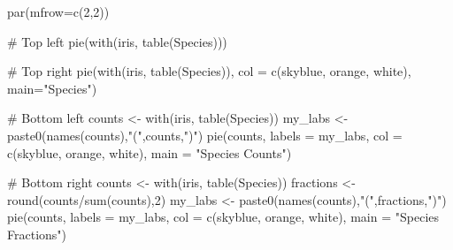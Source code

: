 \documentclass[
  letterpaper,
  DIV=11,
  numbers=noendperiod]{scrreprt}
\newenvironment{Shaded}{\begin{snugshade}}{\end{snugshade}}
\newcommand{\AttributeTok}[1]{\textcolor[rgb]{0.40,0.45,0.13}{#1}}
\newcommand{\CommentTok}[1]{\textcolor[rgb]{0.37,0.37,0.37}{#1}}
\newcommand{\DecValTok}[1]{\textcolor[rgb]{0.68,0.00,0.00}{#1}}
\newcommand{\FunctionTok}[1]{\textcolor[rgb]{0.28,0.35,0.67}{#1}}
\newcommand{\NormalTok}[1]{\textcolor[rgb]{0.00,0.23,0.31}{#1}}
\newcommand{\OtherTok}[1]{\textcolor[rgb]{0.00,0.23,0.31}{#1}}
\newcommand{\SpecialCharTok}[1]{\textcolor[rgb]{0.37,0.37,0.37}{#1}}
\newcommand{\StringTok}[1]{\textcolor[rgb]{0.13,0.47,0.30}{#1}}
\begin{document}
\begin{Shaded}
\begin{Highlighting}[]
\FunctionTok{par}\NormalTok{(}\AttributeTok{mfrow=}\FunctionTok{c}\NormalTok{(}\DecValTok{2}\NormalTok{,}\DecValTok{2}\NormalTok{))}

\CommentTok{\# Top left}
\FunctionTok{pie}\NormalTok{(}\FunctionTok{with}\NormalTok{(iris, }\FunctionTok{table}\NormalTok{(Species)))}

\CommentTok{\# Top right}
\FunctionTok{pie}\NormalTok{(}\FunctionTok{with}\NormalTok{(iris, }\FunctionTok{table}\NormalTok{(Species)), }
    \AttributeTok{col =} \FunctionTok{c}\NormalTok{(}\StringTok{\textquotesingle{}skyblue\textquotesingle{}}\NormalTok{, }\StringTok{\textquotesingle{}orange\textquotesingle{}}\NormalTok{, }\StringTok{\textquotesingle{}white\textquotesingle{}}\NormalTok{), }
    \AttributeTok{main=}\StringTok{"Species"}\NormalTok{)}

\CommentTok{\# Bottom left}
\NormalTok{counts }\OtherTok{\textless{}{-}} \FunctionTok{with}\NormalTok{(iris, }\FunctionTok{table}\NormalTok{(Species))}
\NormalTok{my\_labs }\OtherTok{\textless{}{-}} \FunctionTok{paste0}\NormalTok{(}\FunctionTok{names}\NormalTok{(counts),}\StringTok{"("}\NormalTok{,counts,}\StringTok{")"}\NormalTok{)}
\FunctionTok{pie}\NormalTok{(counts, }
    \AttributeTok{labels =}\NormalTok{ my\_labs, }
    \AttributeTok{col =} \FunctionTok{c}\NormalTok{(}\StringTok{\textquotesingle{}skyblue\textquotesingle{}}\NormalTok{, }\StringTok{\textquotesingle{}orange\textquotesingle{}}\NormalTok{, }\StringTok{\textquotesingle{}white\textquotesingle{}}\NormalTok{), }
    \AttributeTok{main =} \StringTok{"Species Counts"}\NormalTok{)}


\CommentTok{\# Bottom right}
\NormalTok{counts }\OtherTok{\textless{}{-}} \FunctionTok{with}\NormalTok{(iris, }\FunctionTok{table}\NormalTok{(Species))}
\NormalTok{fractions }\OtherTok{\textless{}{-}} \FunctionTok{round}\NormalTok{(counts}\SpecialCharTok{/}\FunctionTok{sum}\NormalTok{(counts),}\DecValTok{2}\NormalTok{)}
\NormalTok{my\_labs }\OtherTok{\textless{}{-}} \FunctionTok{paste0}\NormalTok{(}\FunctionTok{names}\NormalTok{(counts),}\StringTok{"("}\NormalTok{,fractions,}\StringTok{")"}\NormalTok{)}
\FunctionTok{pie}\NormalTok{(counts, }
    \AttributeTok{labels =}\NormalTok{ my\_labs, }
    \AttributeTok{col =} \FunctionTok{c}\NormalTok{(}\StringTok{\textquotesingle{}skyblue\textquotesingle{}}\NormalTok{, }\StringTok{\textquotesingle{}orange\textquotesingle{}}\NormalTok{, }\StringTok{\textquotesingle{}white\textquotesingle{}}\NormalTok{), }
    \AttributeTok{main =} \StringTok{"Species Fractions"}\NormalTok{)}
\end{Highlighting}
\end{Shaded}
\end{document}
